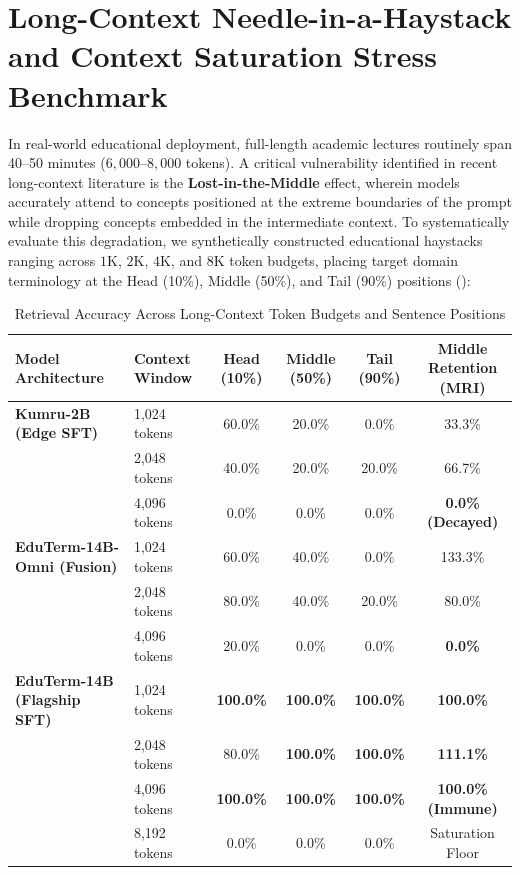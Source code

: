 \documentclass[a4paper,12pt]{report}
\begin{document}
\section{Long-Context Needle-in-a-Haystack and Context Saturation Stress Benchmark}
\label{sec:long_context_haystack_benchmark}
In real-world educational deployment, full-length academic lectures routinely span 40--50 minutes ($6{,}000$--$8{,}000$ tokens). A critical vulnerability identified in recent long-context literature is the \textbf{Lost-in-the-Middle} effect, wherein models accurately attend to concepts positioned at the extreme boundaries of the prompt while dropping concepts embedded in the intermediate context. To systematically evaluate this degradation, we synthetically constructed educational haystacks ranging across $1\text{K}$, $2\text{K}$, $4\text{K}$, and $8\text{K}$ token budgets, placing target domain terminology at the Head (10\%), Middle (50\%), and Tail (90\%) positions ():

\begin{table}[htbp]
\centering
\small
\caption{Retrieval Accuracy Across Long-Context Token Budgets and Sentence Positions}
\label{tab:long_context_haystack_benchmark}
\scriptsize\setlength{\tabcolsep}{2pt}
\begin{tabularx}{\textwidth}{>{\RaggedRight\arraybackslash}Xlcccc}
\hline
\textbf{Model Architecture} & \textbf{Context Window} & \textbf{Head (10\%)} & \textbf{Middle (50\%)} & \textbf{Tail (90\%)} & \textbf{Middle Retention (MRI)} \\
\hline
\textbf{Kumru-2B (Edge SFT)} & 1,024 tokens & 60.0\% & 20.0\% & 0.0\% & 33.3\% \\
& 2,048 tokens & 40.0\% & 20.0\% & 20.0\% & 66.7\% \\
& 4,096 tokens & 0.0\% & 0.0\% & 0.0\% & \textbf{0.0\% (Decayed)} \\
\hline
\textbf{EduTerm-14B-Omni (Fusion)} & 1,024 tokens & 60.0\% & 40.0\% & 0.0\% & 133.3\% \\
& 2,048 tokens & 80.0\% & 40.0\% & 20.0\% & 80.0\% \\
& 4,096 tokens & 20.0\% & 0.0\% & 0.0\% & \textbf{0.0\%} \\
\hline
\textbf{EduTerm-14B (Flagship SFT)} & 1,024 tokens & \textbf{100.0\%} & \textbf{100.0\%} & \textbf{100.0\%} & \textbf{100.0\%} \\
& 2,048 tokens & 80.0\% & \textbf{100.0\%} & \textbf{100.0\%} & \textbf{111.1\%} \\
& 4,096 tokens & \textbf{100.0\%} & \textbf{100.0\%} & \textbf{100.0\%} & \textbf{100.0\% (Immune)} \\
& 8,192 tokens & 0.0\% & 0.0\% & 0.0\% & Saturation Floor \\
\hline
\end{tabularx}
\end{table}
\end{document}
